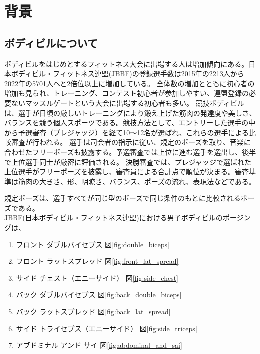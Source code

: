 \chapter{背景}
\label{background}
\section{ボディビルについて}
ボディビルをはじめとするフィットネス大会に出場する人は増加傾向にある。日本ボディビル・フィットネス連盟(JBBF)の登録選手数は2015年の2213人から2022年の5701人へと2倍位以上に増加している\cite{jbbf}。
全体数の増加とともに初心者の増加も見られ、トレーニング、コンテスト初心者が参加しやすい、連盟登録の必要ないマッスルゲートという大会に出場する初心者も多い。
競技ボディビルは、選手が日頃の厳しいトレーニングにより鍛え上げた筋肉の発達度や美しさ、バランスを競う個人スポーツである。競技方法として、エントリーした選手の中から予選審査（プレジャッジ）を経て10～12名が選ばれ、これらの選手による比較審査が行われる。
選手は司会者の指示に従い、規定のポーズを取り、音楽に合わせたフリーポーズも披露する。予選審査では上位に進む選手を選出し、後半で上位選手同士が厳密に評価される。
決勝審査では、プレジャッジで選ばれた上位選手がフリーポーズを披露し、審査員による合計点で順位が決まる。\cite{bodybuilding}審査基準は筋肉の大きさ、形、明瞭さ、バランス、ポーズの流れ、表現法などである。

規定ポーズは、選手すべてが同じ型のポーズで同じ条件のもとに比較されるポーズである。\cite{posing_performance_jbbf} \\
JBBF(日本ボディビル・フィットネス連盟)における男子ボディビルのポージングは、
\begin{enumerate}
    \item フロント ダブルバイセプス 図\ref{fig:double_biceps}
    \item フロント ラットスプレッド 図\ref{fig:front_lat_spread}
    \item サイド チェスト（エニーサイド） 図\ref{fig:side_chest}
    \item バック ダブルバイセプス 図\ref{fig:back_double_biceps}
    \item バック ラットスプレッド 図\ref{fig:back_lat_spread}
    \item サイド トライセプス（エニーサイド） 図\ref{fig:side_triceps}
    \item アブドミナル アンド サイ 図\ref{fig:abdominal_and_sai}
\end{enumerate}

